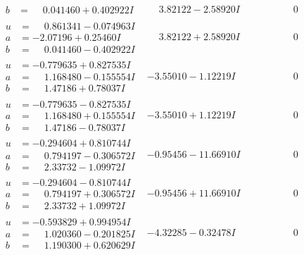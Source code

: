 \documentclass[1p]{elsarticle_modified}
\theoremstyle{definition}
\begin{document}
$$\begin{array}{c|c|c}
\begin{aligned}
b &= \phantom{-}0.041460 + 0.402922 I\end{aligned}
 & \phantom{-}3.82122 - 2.58920 I & \phantom{-0.000000 } 0 \\ \hline\begin{aligned}
u &= \phantom{-}0.861341 - 0.074963 I \\
a &= -2.07196 + 0.25460 I \\
b &= \phantom{-}0.041460 - 0.402922 I\end{aligned}
 & \phantom{-}3.82122 + 2.58920 I & \phantom{-0.000000 } 0 \\ \hline\begin{aligned}
u &= -0.779635 + 0.827535 I \\
a &= \phantom{-}1.168480 - 0.155554 I \\
b &= \phantom{-}1.47186 + 0.78037 I\end{aligned}
 & -3.55010 - 1.12219 I & \phantom{-0.000000 } 0 \\ \hline\begin{aligned}
u &= -0.779635 - 0.827535 I \\
a &= \phantom{-}1.168480 + 0.155554 I \\
b &= \phantom{-}1.47186 - 0.78037 I\end{aligned}
 & -3.55010 + 1.12219 I & \phantom{-0.000000 } 0 \\ \hline\begin{aligned}
u &= -0.294604 + 0.810744 I \\
a &= \phantom{-}0.794197 - 0.306572 I \\
b &= \phantom{-}2.33732 - 1.09972 I\end{aligned}
 & -0.95456 - 11.66910 I & \phantom{-0.000000 } 0 \\ \hline\begin{aligned}
u &= -0.294604 - 0.810744 I \\
a &= \phantom{-}0.794197 + 0.306572 I \\
b &= \phantom{-}2.33732 + 1.09972 I\end{aligned}
 & -0.95456 + 11.66910 I & \phantom{-0.000000 } 0 \\ \hline\begin{aligned}
u &= -0.593829 + 0.994954 I \\
a &= \phantom{-}1.020360 - 0.201825 I \\
b &= \phantom{-}1.190300 + 0.620629 I\end{aligned}
 & -4.32285 - 0.32478 I & \phantom{-0.000000 } 0 \\ \hline\begin{aligned}

\end{aligned}
\end{array}$$
\end{document}

